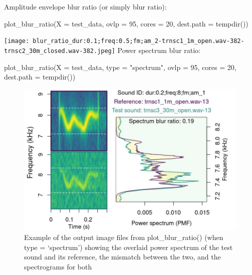 \documentclass[
  letterpaper,
  DIV=11,
  numbers=noendperiod]{scrartcl}
\newenvironment{Shaded}{\begin{snugshade}}{\end{snugshade}}
\newcommand{\AttributeTok}[1]{\textcolor[rgb]{0.49,0.56,0.16}{#1}}
\newcommand{\DecValTok}[1]{\textcolor[rgb]{0.25,0.63,0.44}{#1}}
\newcommand{\FunctionTok}[1]{\textcolor[rgb]{0.02,0.16,0.49}{#1}}
\newcommand{\NormalTok}[1]{\textcolor[rgb]{0.00,0.44,0.13}{#1}}
\newcommand{\StringTok}[1]{\textcolor[rgb]{0.25,0.44,0.63}{#1}}
\begin{document}
Amplitude envelope blur ratio (or simply blur ratio):

\begin{Shaded}
\begin{Highlighting}[numbers=left,,]
\FunctionTok{plot\_blur\_ratio}\NormalTok{(}\AttributeTok{X =}\NormalTok{ test\_data, }\AttributeTok{ovlp =} \DecValTok{95}\NormalTok{, }\AttributeTok{cores =} \DecValTok{20}\NormalTok{, }\AttributeTok{dest.path =} \FunctionTok{tempdir}\NormalTok{())}
\end{Highlighting}
\end{Shaded}

\texttt{[image: blur\_ratio\_dur:0.1;freq:0.5;fm;am\_2-trnsc1\_1m\_open.wav-382-trnsc2\_30m\_closed.wav-382.jpeg]}
Power spectrum blur ratio:

\begin{Shaded}
\begin{Highlighting}[numbers=left,,]
\FunctionTok{plot\_blur\_ratio}\NormalTok{(}\AttributeTok{X =}\NormalTok{ test\_data, }\AttributeTok{type =} \StringTok{"spectrum"}\NormalTok{, }\AttributeTok{ovlp =} \DecValTok{95}\NormalTok{, }\AttributeTok{cores =} \DecValTok{20}\NormalTok{,}
    \AttributeTok{dest.path =} \FunctionTok{tempdir}\NormalTok{())}
\end{Highlighting}
\end{Shaded}

\begin{figure}

{\centering \includegraphics{spectrum_blur_ratio_dur:0.2;freq:8;fm;am_1-trnsc1_1m_open.wav-13-trnsc3_30m_open.wav-13.jpeg}

}

\caption{Example of the output image files from plot\_blur\_ratio()
(when type = `spectrum') showing the overlaid power spectrum of the test
sound and its reference, the mismatch between the two, and the
spectrograms for both}

\end{figure}
\end{document}
